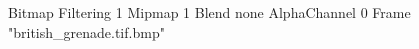 {Bitmap
	{Filtering 1}
	{Mipmap 1}
	{Blend none}
	{AlphaChannel 0}
	{Frame "british_grenade.tif.bmp"}
}
